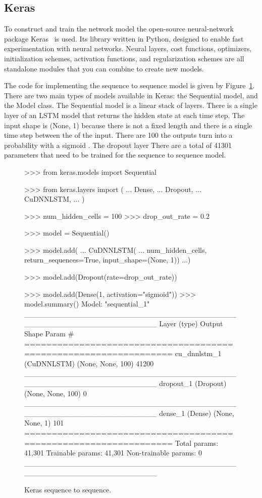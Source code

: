 \subsection{Keras}

To construct and train the network model the open-source neural-network package
Keras~\cite{Chollet2015} is used. Its library written in Python, designed to
enable fast experimentation with neural networks.
Neural layers, cost functions, optimizers, initialization schemes, activation
functions, and regularization schemes are all standalone modules that you can
combine to create new models.

The code for implementing the sequence to sequence model is given by
Figure~\ref{fig:keras_sequence_to_sequence}. There are two main types of models
available in Keras: the Sequential model, and the Model class. The Sequential
model is a linear stack of layers. There is a single layer of an LSTM model that
returns the hidden state at each time step. The input shape is (None, 1) because
there is not a fixed length and there is a single time step between the of the
input. There are 100 the outputs turn into a probability with a sigmoid . The
dropout layer 
There are a total of 41301 parameters that need to be trained for the sequence
to sequence model.

\begin{figure}[!htbp]
\begin{usagepy}
>>> from keras.models import Sequential

>>> from keras.layers import (
...     Dense,
...     Dropout,
...     CuDNNLSTM,
... )

>>> num_hidden_cells = 100
>>> drop_out_rate = 0.2

>>> model = Sequential()

>>> model.add(
...    CuDNNLSTM(
...        num_hidden_cells, return_sequences=True, input_shape=(None, 1))
...)

>>> model.add(Dropout(rate=drop_out_rate))

>>> model.add(Dense(1, activation="sigmoid"))
>>> model.summary()
Model: "sequential_1"
_________________________________________________________________
Layer (type)                 Output Shape              Param #   
=================================================================
cu_dnnlstm_1 (CuDNNLSTM)     (None, None, 100)         41200     
_________________________________________________________________
dropout_1 (Dropout)          (None, None, 100)         0         
_________________________________________________________________
dense_1 (Dense)              (None, None, 1)           101       
=================================================================
Total params: 41,301
Trainable params: 41,301
Non-trainable params: 0
_________________________________________________________________

\end{usagepy}
\caption{Keras sequence to sequence.}\label{fig:keras_sequence_to_sequence}
\end{figure}

